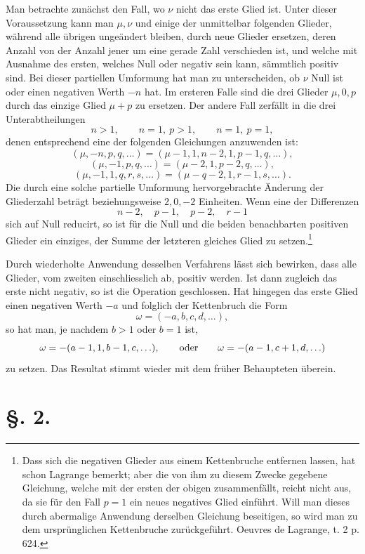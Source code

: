 \documentclass[11pt]{article}
\begin{document}
Man betrachte zunächst den Fall, wo $\nu$ nicht das erste Glied ist. Unter dieser Voraussetzung kann man $\mu,\nu$ und einige der unmittelbar folgenden Glieder, während alle übrigen ungeändert bleiben, durch neue Glieder ersetzen, deren Anzahl von der Anzahl jener um eine gerade Zahl verschieden ist, und welche mit Ausnahme des ersten, welches Null oder negativ sein kann, sämmtlich positiv sind. Bei dieser partiellen Umformung hat man zu unterscheiden, ob $\nu$ Null ist oder einen negativen Werth $-n$ hat. Im ersteren Falle sind die drei Glieder $\mu,0,p$ durch das einzige Glied $\mu+p$ zu ersetzen. Der andere Fall zerfällt in die drei Unterabtheilungen
\[
 n>1,\qquad n=1,\ p>1,\qquad n=1,\ p=1,
\]
denen entsprechend eine der folgenden Gleichungen anzuwenden ist:
\[
 (\mu,-n,p,q,\ldots)=(\mu-1,1,n-2,1,p-1,q,\ldots),
\]
\[
 (\mu,-1,p,q,\ldots)=(\mu-2,1,p-2,q,\ldots),
\]
\[
 (\mu,-1,1,q,r,s,\ldots)=(\mu-q-2,1,r-1,s,\ldots).
\]
Die durch eine solche partielle Umformung hervorgebrachte Änderung der Gliederzahl beträgt beziehungsweise $2,0,-2$ Einheiten. Wenn eine der Differenzen
\[
 n-2,\quad p-1,
\quad p-2,
\quad r-1
\]
sich auf Null reducirt, so ist für die Null und die beiden benachbarten positiven Glieder ein einziges, der Summe der letzteren gleiches Glied zu setzen.\footnote{Dass sich die negativen Glieder aus einem Kettenbruche entfernen lassen, hat schon Lagrange bemerkt; aber die von ihm zu diesem Zwecke gegebene Gleichung, welche mit der ersten der obigen zusammenfällt, reicht nicht aus, da sie für den Fall $p=1$ ein neues negatives Glied einführt. Will man dieses durch abermalige Anwendung derselben Gleichung beseitigen, so wird man zu dem ursprünglichen Kettenbruche zurückgeführt. Oeuvres de Lagrange, t. 2 p. 624.}

Durch wiederholte Anwendung desselben Verfahrens lässt sich bewirken, dass alle Glieder, vom zweiten einschliesslich ab, positiv werden. Ist dann zugleich das erste nicht negativ, so ist die Operation geschlossen. Hat hingegen das erste Glied einen negativen Werth $-a$ und folglich der Kettenbruch die Form
\[
  \omega=(-a,b,c,d,\ldots),
\]
so hat man, je nachdem $b>1$ oder $b=1$ ist,
\[
 \omega=-(a-1,1,b-1,c,\ldots),
 \qquad\hbox{oder}\qquad
 \omega=-(a-1,c+1,d,\ldots)
\]
zu setzen. Das Resultat stimmt wieder mit dem früher Behaupteten überein.

\section*{\S. 2.}
\end{document}
